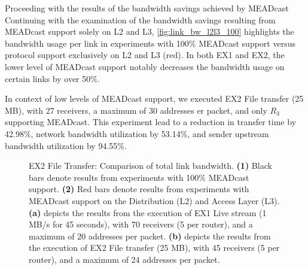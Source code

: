 Proceeding with the results of the bandwidth savings achieved by MEADcast
Continuing with the examination of the bandwidth savings resulting from
    MEADcast support solely on L2 and L3, \autoref{fig:link_bw_l2l3_100}
    highlights the bandwidth usage per link in experiments with 100\% MEADcast
    support versus protocol support exclusively on L2 and L3 (red).
In both EX1 and EX2, the lower level of MEADcast support notably decreases
    the bandwidth usage on certain links by over 50\%.
    
In context of low levels of MEADcast support, we executed EX2 File transfer
    (25 MB), with 27 receivers, a maximum of 30 addresses er packet, and only
    $R_3$ supporting MEADcast.
This experiment lead to a reduction in transfer time by 42.98\%, network
    bandwidth utilization by 53.14\%, and sender upstream bandwidth utilization
    by 94.55\%.

\begin{figure}
    \begin{center}
        
    \end{center}
    \caption[EX2 File Transfer: Comparison of total link bandwidth]{
        EX2 File Transfer: Comparison of total link bandwidth.
        \textbf{(1)} Black bars denote results from experiments with 100\%
            MEADcast support.
        \textbf{(2)} Red bars denote results from experiments with MEADcast
            support on the Distribution (L2) and Access Layer (L3).
        \textbf{(a)} depicts the results from the execution of EX1 Live
            stream (1 MB/s for 45 seconds), with 70 receivers (5 per router),
            and a maximum of 20 addresses per packet.
        \textbf{(b)} depicts the results from the execution of EX2 File
            transfer (25 MB), with 45 receivers (5 per router), and a maximum
            of 24 addresses per packet.
    }
    \label{fig:link_bw_l2l3_100}
\end{figure}


